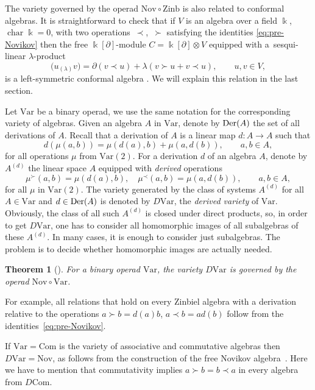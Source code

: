 \documentclass[11pt]{article}
\numberwithin{equation}{section}
\numberwithin{equation}{section}
\newtheorem{Theorem}{Theorem}[section]
\def\Var{\mathrm{Var}}
\def\Nov{\mathrm{Nov}}
\def\Com{\mathrm{Com}}
\def\Zinb{\mathrm{Zinb}}
\def\Der {\mathop {\fam 0 Der}\nolimits}
\begin{document}
\begin{Remark}\label{rem:Conformal}
The variety governed by the operad $\Nov\circ \Zinb $
is also related to conformal algebras.
It is straightforward to check that if $V$ is an algebra over a field $\Bbbk $, $\operatorname{char}\Bbbk =0$, with two
operations~$\prec$,~$\succ $ satisfying the identities
\eqref{eq:pre-Novikov}
then the free
$\Bbbk [\partial ]$-module $C=\Bbbk[\partial ]\otimes V$
equipped with a~sesqui-linear $\lambda $-product
\[
\bigl(u{}_{(\lambda )} v\bigr) = \partial (v\prec u) + \lambda (v\succ u + v\prec u),
\qquad u,v\in V,
\]
is a left-symmetric conformal algebra \cite{HongLi2015}.
We will explain this relation in the last section.
\end{Remark}

Let $\Var $ be a binary operad, we use the same notation for the
corresponding variety of algebras.
Given an algebra $A$ in $\Var $, denote by $\Der(A) $
the set of all derivations of $A$. Recall that
a derivation of $A$ is a linear map $d\colon A\to A$
such that
\[
 d(\mu(a,b)) = \mu(d(a),b) + \mu(a,d(b)), \qquad a,b\in A,
\]
for all operations $\mu $ from $\Var (2)$.
For a derivation $d$ of an algebra $A$, denote by
$A^{(d)}$ the linear space $A$ equipped with {\em derived}
operations
%
\begin{equation}\label{eq:Der-op}
 \mu^{\succ }(a,b) = \mu(d(a),b), \quad \mu^{\prec }(a,b) = \mu(a,d(b)), \qquad a,b\in A,
\end{equation}
%
for all $\mu $ in $\Var (2)$.
The variety generated by the class of systems $A^{(d)}$ for all $A\in \Var$ and $d\in \Der(A)$
is denoted by $D\Var$, the {\em derived variety} of $\Var $.
Obviously, the class of all such $A^{(d)}$ is closed under direct products,
so, in order to get $D\Var$, one has to consider all homomorphic images of all subalgebras of these $A^{(d)}$.
In many cases, it is enough to consider just subalgebras.
The problem is to decide whether homomorphic images are actually needed.

\begin{Theorem}[\cite{KSO2019}]
For a binary operad $\Var $, the variety $D\Var $ is governed
by the operad ${\Nov\circ \Var}$.
\end{Theorem}

For example,
all relations that hold
on every Zinbiel algebra with a derivation relative to
the operations $a\succ b = d(a)b$, $a\prec b = ad(b)$
follow from the identities~\eqref{eq:pre-Novikov}.

If $\Var = \Com$ is the variety of associative and commutative algebras
then $D\Var = \Nov$, as follows from the construction of the free Novikov
algebra~\cite{DzhLofwall2002}. Here we have to mention
that commutativity implies $a\succ b = b\prec a$ in every
algebra from $D\Com $.
\end{document}
